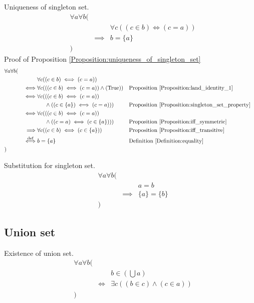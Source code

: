\begin{prop}
\label{Proposition:uniqueness_of_singleton_set}
Uniqueness of singleton set.
\begin{align*}
& \forall a \forall b ( \\
& & & \forall c ((c \in b) \iff (c = a)) \\
& & \implies & b = \{ a \} \\
& )
\end{align*}
Proof of Proposition \ref{Proposition:uniqueness_of_singleton_set}
\begin{align*}
& \forall a \forall b ( \\
& & & \forall c ((c \in b) \iff (c = a)) \\
& & \iff & \forall c (((c \in b) \iff (c = a)) \land (\text{True}))
& & \text{Proposition \ref{Proposition:land_identity_1}} \\
& & \iff & \forall c (((c \in b) \iff (c = a)) \\
& & & \phantom{\forall c (} \land ((c \in \{ a \}) \iff (c = a)))
& & \text{Proposition \ref{Proposition:singleton_set_property}} \\
& & \iff & \forall c (((c \in b) \iff (c = a)) \\
& & & \phantom{\forall c (} \land ((c = a) \iff (c \in \{ a \})))
& & \text{Proposition \ref{Proposition:iff_symmetric}} \\
& & \implies & \forall c ((c \in b) \iff (c \in \{ a \}))
& & \text{Proposition \ref{Proposition:iff_transitive}} \\
& & \overset{\operatorname{def}}{\iff} & b = \{ a \}
& & \text{Definition \ref{Definition:equality}} \\
& )
\end{align*}
\end{prop}

\begin{prop}
\label{Proposition:substitution_of_singleton_set}
Substitution for singleton set.
\begin{align*}
& \forall a \forall b ( \\
& & & a = b \\
& & \implies & \{ a \} = \{ b \} \\
& )
\end{align*}
\end{prop}

\subsection{Union set}
\begin{axm}
\label{Axiom:existence_of_union_set}
Existence of union set.
\begin{align*}
& \forall a \forall b ( \\
& & & b \in (\bigcup a) \\
& & \iff & \exists c ((b \in c) \land (c \in a)) \\
& )
\end{align*}
\end{axm}

